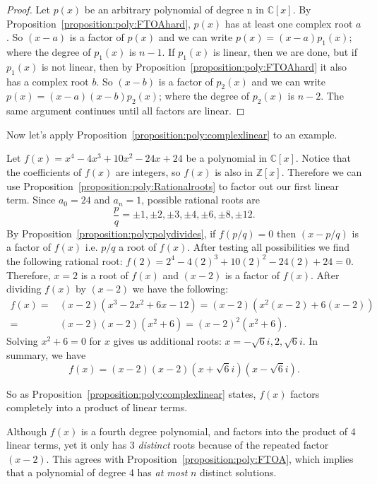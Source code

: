\begin{proof}{} 
Let $p(x)$ be an arbitrary polynomial of degree n in $\mathbb{C}[x]$. By Proposition~\ref{proposition:poly:FTOAhard}, $p(x)$ has at least one complex root $a$. So $(x-a)$ is a factor of $p(x)$ and we can write $p(x)=(x-a)p_1(x)$; where the degree of $p_1(x)$ is $n-1$. If $p_1(x)$ is linear, then we are done, but if $p_1(x)$ is not linear, then by Proposition~\ref{proposition:poly:FTOAhard} it also has a complex root $b$. So $(x-b)$ is a factor of $p_2(x)$ and we can write $p(x)=(x-a)(x-b)p_2(x)$; where the degree of $p_2(x)$ is $n-2$. The same argument continues until all factors are linear.
\end{proof}

Now let's apply Proposition~\ref{proposition:poly:complexlinear} to an example.

\begin{example}{}
Let $f(x)=x^4-4x^3+10x^2-24x+24$ be a polynomial in $\mathbb{C}[x]$. Notice that the coefficients of $f(x)$ are integers, so $f(x)$ is also in $\mathbb{Z}[x]$. Therefore we can use Proposition~\ref{proposition:poly:Rationalroots} to factor out our first linear term. Since $a_0=24$ and $a_n=1$, possible rational roots are 
$$\frac{p}{q}= \pm1, \pm 2, \pm 3, \pm 4,\pm 6, \pm 8, \pm 12.$$ 
By Proposition~\ref{proposition:poly:polydivides}, if $f(p/q)=0$ then $(x-p/q)$ is a factor of $f(x)$ i.e. $p/q$ a root of $f(x)$. After testing all possibilities we find the following rational root:
$f(2)=2^4-4(2)^3+10(2)^2-24(2)+24=0$. Therefore, $x=2$ is a root of $f(x)$ and $(x-2)$ is a factor of $f(x)$. After dividing $f(x)$ by $(x-2)$ we have the following: 
\begin{align*}
f(x)=& (x-2)(x^3-2x^2+6x-12)=(x-2)(x^2(x-2)+6(x-2))\\
=&(x-2)(x-2)(x^2+6)=(x-2)^2(x^2+6). 
\end{align*}
Solving $x^2+6=0$  for $x$ gives us additional roots: $x = -\sqrt6 i, 2,\sqrt6 i$. In summary, we have
$$f(x)= (x-2)(x-2)(x+\sqrt{6}i)(x-\sqrt{6}i).$$ 

So as Proposition~\ref{proposition:poly:complexlinear} states, $f(x)$  factors completely into a product of  linear terms. 
\end{example}

\begin{rem}
Although $f(x)$ is a fourth degree polynomial, and factors into the product of 4 linear terms, yet it only has 3 \emph{distinct} roots because of the repeated factor $(x-2)$. This agrees with  Proposition~\ref{proposition:poly:FTOA}, which implies that a polynomial of degree 4 has \emph{at most} $n$ distinct solutions.  
\end{rem}

